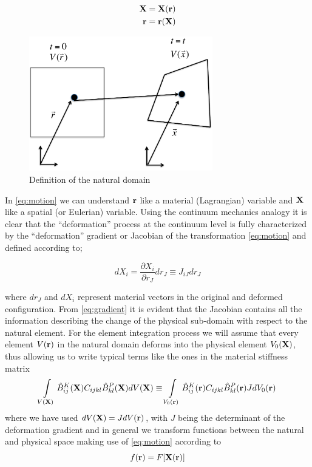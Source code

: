 \begin{equation}
\begin{aligned}
\vb{X}&=\vb{X}(\vb{r})\\
\vb{r}&=\vb{r}(\vb{X})
\end{aligned}
\label{eq:motion}
\end{equation}

\begin{figure}[h]
\centering
\includegraphics[width=8cm]{figure1.pdf}
\caption{Definition of the natural domain}
\label{fig:natural domain}
\end{figure}

 

In \cref{eq:motion} we can understand $\vb{r}$ like a material (Lagrangian) variable and $\vb{X}$ like a spatial (or Eulerian) variable. Using the continuum mechanics analogy it is clear that the ``deformation'' process at the continuum level is fully characterized by the ``deformation'' gradient or Jacobian of the transformation \cref{eq:motion} and defined according to;

\begin{equation}
dX_i=\dfrac{\partial X_i}{\partial r_J}dr_J\equiv J_{iJ}dr_{J}
\label{eq:gradient}
\end{equation}

where $dr_{J}$ and $dX_i$ represent material vectors in the original and deformed configuration. From \cref{eq:gradient} it is evident that the Jacobian contains all the information describing the change of the physical sub-domain with respect to the natural element. For the element integration process we will assume that every element $V(\vb{r})$ in the natural domain deforms into the physical element $V_0(\vb{X})$, thus allowing us to write typical terms like the ones in the material stiffness matrix
\begin{equation}
\int\limits_{V(\vb{X})} \hat{B}_{ij}^K(\vb{X}) C_{ijkl} \hat{B}_{kl}^P(\vb{X}) dV(\vb{X})\equiv \int\limits_{V_0(\vb{r})} \hat{B}_{ij}^K(\vb{r}) C_{ijkl} \hat{B}_{kl}^P(\vb{r})J dV_0(\vb{r})
\label{eq:matmatrix}
\end{equation}
where we have used $dV(\vb{X})=JdV(\vb{r})$, with $J$ being the determinant of the deformation gradient and in general we transform functions between the natural and physical space making use of \cref{eq:motion} according to
\begin{equation}
f(\vb{r})=F[\vb{X}(\vb{r})]
\label{eq:funtrans}
\end{equation}


